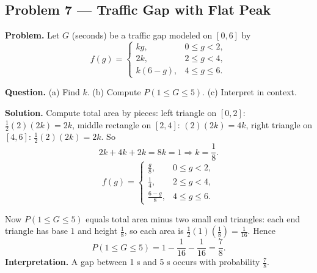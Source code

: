 \begin{ExamProblems}
		
		\item
		\subsection*{Problem 7 — Traffic Gap with Flat Peak}
		
		\textbf{Problem.}
		Let $G$ (seconds) be a traffic gap modeled on $[0,6]$ by
		\[
		f(g)=\begin{cases}
		kg, & 0\le g<2,\\
		2k, & 2\le g<4,\\
		k(6-g), & 4\le g\le 6.
		\end{cases}
		\]
		
		\textbf{Question.}
		(a) Find $k$.
		(b) Compute $P(1\le G\le 5)$.
		(c) Interpret in context.
		
		\textbf{Solution.}
		Compute total area by pieces:
		left triangle on $[0,2]$: $\frac{1}{2}(2)(2k)=2k$,
		middle rectangle on $[2,4]$: $(2)(2k)=4k$,
		right triangle on $[4,6]$: $\frac{1}{2}(2)(2k)=2k$.
		So
		\[
		2k+4k+2k=8k=1\Rightarrow k=\frac{1}{8}.
		\]
		\[
		f(g)=\begin{cases}
		\frac{g}{8}, & 0\le g<2,\\
		\frac{1}{4}, & 2\le g<4,\\
		\frac{6-g}{8}, & 4\le g\le 6.
		\end{cases}
		\]
		\begin{center}
		\end{center}
		Now $P(1\le G\le 5)$ equals total area minus two small end triangles:
		each end triangle has base $1$ and height $\frac{1}{8}$, so each area is
		$\frac{1}{2}(1)\left(\frac{1}{8}\right)=\frac{1}{16}$.
		Hence
		\[
		P(1\le G\le 5)=1-\frac{1}{16}-\frac{1}{16}=\frac{7}{8}.
		\]
		\textbf{Interpretation.} A gap between 1 s and 5 s occurs with probability $\frac{7}{8}$.
		
		

\end{ExamProblems}

